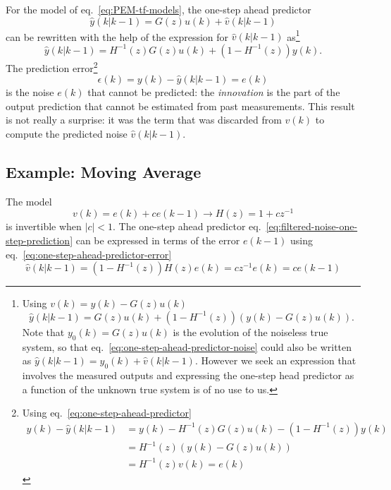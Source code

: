 For the model of eq.~\eqref{eq:PEM-tf-models}, the one-step ahead predictor
\begin{equation}
  \label{eq:one-step-ahead-predictor-noise}
  \hat{y}(k|k-1) = G(z)u(k) + \hat{v}(k|k-1)
\end{equation}
can be rewritten with the help of the expression for $\hat{v}(k|k-1)$ as\footnote{Using $v(k) = y(k) - G(z)u(k)$
  \begin{equation*}
    \hat{y}(k|k-1) = G(z)u(k) + \left(1-H^{-1}(z)\right)\left(y(k) - G(z)u(k)\right).
  \end{equation*}
Note that $y_0(k)=G(z)u(k)$ is the evolution of the noiseless true system, so that eq.~\eqref{eq:one-step-ahead-predictor-noise} could also be written as $\hat{y}(k|k-1) = y_0(k) + \hat{v}(k|k-1)$. However we seek an expression that involves the measured outputs and expressing the one-step head predictor as a function of the unknown true system is of no use to us.\label{fn:noiseless-regressor}}
\begin{equation}
  \label{eq:one-step-ahead-predictor}
  \hat{y}(k|k-1) = H^{-1}(z)G(z)u(k) + \left(1-H^{-1}(z)\right) y(k).
\end{equation}
The prediction error\footnote{Using eq.~\eqref{eq:one-step-ahead-predictor}
\begin{align*}
  y(k) - \hat{y}(k|k-1) &= y(k) - H^{-1}(z)G(z)u(k) - \left(1-H^{-1}(z)\right) y(k) \\
                        &= H^{-1}(z)(y(k) - G(z)u(k)) \\
                        &= H^{-1}(z)v(k) = e(k)
\end{align*}}
\begin{equation}
  \label{eq:one-step-ahead-predictor-error}
  \epsilon(k) = y(k) - \hat{y}(k|k-1) = e(k)
\end{equation}
is the noise $e(k)$ that cannot be predicted: the \emph{innovation} is the part of the output prediction that cannot be estimated from past measurements. This result is not really a surprise: it was the term that was discarded from $v(k)$ to compute the predicted noise $\hat{v}(k|k-1)$.

\subsection{Example: Moving Average}

The model
\begin{equation*}
  v(k) = e(k) + ce(k-1) \rightarrow H(z) = 1+cz^{-1}
\end{equation*}
is invertible when $|c|<1$. The one-step ahead predictor eq.~\eqref{eq:filtered-noise-one-step-prediction} can be expressed in terms of the error $e(k-1)$ using eq.~\eqref{eq:one-step-ahead-predictor-error}
\begin{equation*}
  \hat{v}(k|k-1) = \left(1-H^{-1}(z)\right)H(z)e(k) = cz^{-1}e(k) =  ce(k-1)
\end{equation*}

